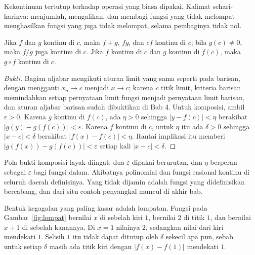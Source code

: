 Kekontinuan tertutup terhadap operasi yang biasa dipakai. Kalimat sehari-harinya:
menjumlah, mengalikan, dan membagi fungsi yang tidak melompat menghasilkan fungsi yang
juga tidak melompat, selama pembaginya tidak nol.

\begin{proposisi}
Jika $f$ dan $g$ kontinu di $c$, maka $f+g$, $fg$, dan $cf$ kontinu di $c$; bila
$g(c)\neq 0$, maka $f/g$ juga kontinu di $c$. Jika $f$ kontinu di $c$ dan $g$ kontinu
di $f(c)$, maka $g\circ f$ kontinu di $c$.
\end{proposisi}

\begin{proof}[Bukti]
Bagian aljabar mengikuti aturan limit yang sama seperti pada barisan, dengan
mengganti $x_{n}\to c$ menjadi $x\to c$; karena $c$ titik limit, kriteria barisan
memindahkan setiap pernyataan limit fungsi menjadi pernyataan limit barisan, dan
aturan aljabar barisan sudah dibuktikan di Bab 4. Untuk komposisi, ambil
$\varepsilon>0$. Karena $g$ kontinu di $f(c)$, ada $\eta>0$ sehingga
$|y-f(c)|<\eta$ berakibat $|g(y)-g(f(c))|<\varepsilon$. Karena $f$ kontinu di $c$,
untuk $\eta$ itu ada $\delta>0$ sehingga $|x-c|<\delta$ berakibat
$|f(x)-f(c)|<\eta$. Rantai implikasi itu memberi $|g(f(x))-g(f(c))|<\varepsilon$
setiap kali $|x-c|<\delta$.
\end{proof}

Pola bukti komposisi layak diingat: dua $\varepsilon$ dipakai berurutan, dan $\eta$
berperan sebagai $\varepsilon$ bagi fungsi dalam. Akibatnya polinomial dan fungsi
rasional kontinu di seluruh daerah definisinya. Yang tidak dijamin adalah fungsi yang
didefinisikan bercabang, dan dari situ contoh penyangkal muncul di akhir bab.

Bentuk kegagalan yang paling kasar adalah lompatan. Fungsi pada
Gambar~\ref{fig:lompat} bernilai $x$ di sebelah kiri $1$, bernilai $2$ di titik $1$,
dan bernilai $x+1$ di sebelah kanannya. Di $x=1$ nilainya $2$, sedangkan nilai dari
kiri mendekati $1$. Selisih $1$ itu tidak dapat ditutup oleh $\delta$ sekecil apa pun,
sebab untuk setiap $\delta$ masih ada titik kiri dengan $|f(x)-f(1)|$ mendekati $1$.

